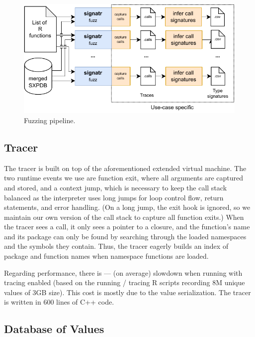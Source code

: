 \documentclass[sigplan,screen]{acmart}
\begin{document}
\begin{figure}
    \centering
    \includegraphics[width=\columnwidth]{code-and-figures/fuzz-pipeline.pdf}
    \caption{    Fuzzing pipeline.    }\label{fig:fuzz-pipeline}
\end{figure}

\subsection{Tracer}\label{sec:argtracer}

The tracer is built on top of the aforementioned extended virtual machine.
The two runtime events we use are function exit, where all arguments are
captured and stored, and a context jump, which is necessary to keep
the call stack balanced as the interpreter uses long jumps for loop
control flow, return statements, and error handling.  (On a long jump,
the exit hook is ignored, so we maintain our own version of the call stack
to capture all function exits.)
When the tracer sees a call, it only sees a pointer to a closure, and the
function's name and its package can only be found by searching through
the loaded name\-spaces and the symbols they contain.  Thus,
the tracer eagerly builds an index of package and function names when
name\-space functions are loaded.

Regarding performance, there is \TRMinTracingOverhead ---
\TRMaxTracingOverhead (\TRAvgTracingOverhead on average) slowdown when
running with tracing enabled (based on the running / tracing
\TRTracingFiles R scripts recording 8M unique values of 3GB size).
This cost is mostly due to the value serialization.  The tracer is written in 600 lines of
C++ code.

\subsection{Database of Values}\label{sec:sxpdb}
\end{document}
